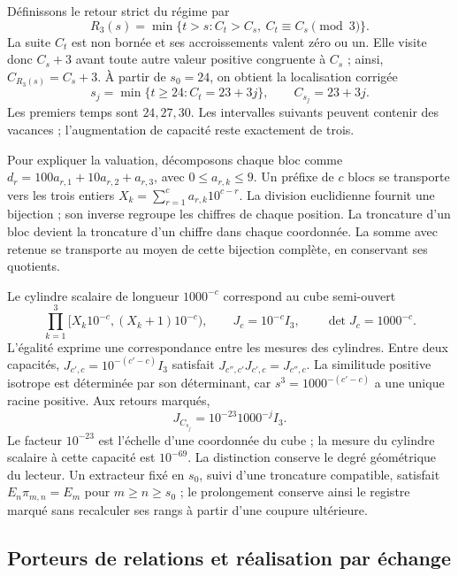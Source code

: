 Définissons le retour strict du régime par
\[
 R_3(s)=\min\{t>s:C_t>C_s,\ C_t\equiv C_s\pmod3\}.
\]
La suite $C_t$ est non bornée et ses accroissements valent zéro ou un.
Elle visite donc $C_s+3$ avant toute autre valeur positive congruente
à $C_s$ ; ainsi, $C_{R_3(s)}=C_s+3$. À partir de $s_0=24$, on obtient la
localisation corrigée
\begin{equation}
 s_j=\min\{t\geq24:C_t=23+3j\},\qquad C_{s_j}=23+3j.
 \label{eq:ii-ter27-localizacion}
\end{equation}
Les premiers temps sont $24,27,30$. Les intervalles suivants peuvent
contenir des vacances ; l’augmentation de capacité reste exactement de trois.

Pour expliquer la valuation, décomposons chaque bloc comme
$d_r=100a_{r,1}+10a_{r,2}+a_{r,3}$, avec $0\leq a_{r,k}\leq9$.
Un préfixe de $c$ blocs se transporte vers les trois entiers
$X_k=\sum_{r=1}^c a_{r,k}10^{c-r}$. La division euclidienne fournit
une bijection ; son inverse regroupe les chiffres de chaque position. La
troncature d’un bloc devient la troncature d’un chiffre
dans chaque coordonnée. La somme avec retenue se transporte au moyen de cette
bijection complète, en conservant ses quotients.

Le cylindre scalaire de longueur $1000^{-c}$ correspond au cube semi-ouvert
\[
 \prod_{k=1}^3[X_k10^{-c},(X_k+1)10^{-c}),\qquad
 J_c=10^{-c}I_3,\qquad \det J_c=1000^{-c}.
\]
L’égalité exprime une correspondance entre les mesures des cylindres. Entre
deux capacités, $J_{c',c}=10^{-(c'-c)}I_3$ satisfait
$J_{c'',c'}J_{c',c}=J_{c'',c}$. La similitude positive isotrope est
déterminée par son déterminant, car $s^3=1000^{-(c'-c)}$ a une
unique racine positive. Aux retours marqués,
\begin{equation}
 J_{C_{s_j}}=10^{-23}1000^{-j}I_3.
 \label{eq:ii-ter27-cociclo}
\end{equation}
Le facteur $10^{-23}$ est l’échelle d’une coordonnée du cube ; la mesure
du cylindre scalaire à cette capacité est $10^{-69}$. La distinction conserve
le degré géométrique du lecteur. Un extracteur fixé en $s_0$, suivi d’une
troncature compatible, satisfait $E_n\pi_{m,n}=E_m$ pour $m\geq n\geq
s_0$ ; le prolongement conserve ainsi le registre marqué sans recalculer ses
rangs à partir d’une coupure ultérieure.

\subsection{Porteurs de relations et réalisation par échange}
\label{sec:ii-ter27-portador}


